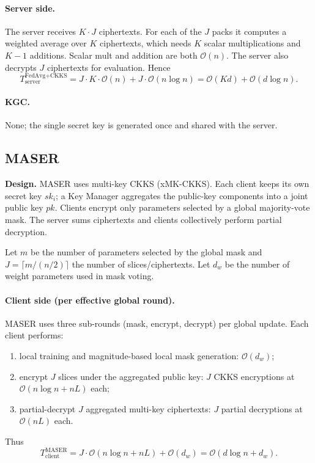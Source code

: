 \documentclass[a4paper,11pt]{article}
\begin{document}
\paragraph{Server side.} The server receives $K\cdot J$ ciphertexts. For each of the $J$ packs it computes a weighted average over $K$ ciphertexts, which needs $K$ scalar multiplications and $K-1$ additions. Scalar mult and addition are both $\mathcal{O}(n)$. The server also decrypts $J$ ciphertexts for evaluation. Hence
\begin{equation}
\boxed{T_{\text{server}}^{\text{FedAvg+CKKS}} = J\cdot K\cdot\mathcal{O}(n) + J\cdot\mathcal{O}(n\log n) = \mathcal{O}(Kd) + \mathcal{O}(d\log n).}
\end{equation}

\paragraph{KGC.} None; the single secret key is generated once and shared with the server.

\subsection{MASER}
\label{ssec:maser}

\textbf{Design.} MASER uses multi-key CKKS (xMK-CKKS). Each client keeps its own secret key $sk_i$; a Key Manager aggregates the public-key components into a joint public key $pk$. Clients encrypt only parameters selected by a global majority-vote mask. The server sums ciphertexts and clients collectively perform partial decryption.

Let $m$ be the number of parameters selected by the global mask and $J=\lceil m/(n/2)\rceil$ the number of slices/ciphertexts. Let $d_w$ be the number of weight parameters used in mask voting.

\paragraph{Client side (per effective global round).} MASER uses three sub-rounds (mask, encrypt, decrypt) per global update. Each client performs:
\begin{enumerate}
    \item local training and magnitude-based local mask generation: $\mathcal{O}(d_w)$;
    \item encrypt $J$ slices under the aggregated public key: $J$ CKKS encryptions at $\mathcal{O}(n\log n + nL)$ each;
    \item partial-decrypt $J$ aggregated multi-key ciphertexts: $J$ partial decryptions at $\mathcal{O}(nL)$ each.
\end{enumerate}
Thus
\begin{equation}
\boxed{T_{\text{client}}^{\text{MASER}} = J\cdot\mathcal{O}(n\log n + nL) + \mathcal{O}(d_w) = \mathcal{O}(d\log n + d_w).}
\end{equation}
\end{document}
